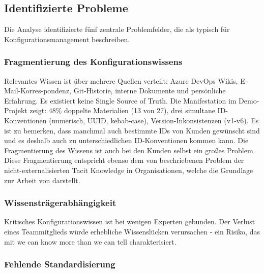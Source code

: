 \subsection{Identifizierte Probleme}
\label{subsec:Probleme}

Die Analyse identifizierte fünf zentrale Problemfelder, die \cite{zuin:llm_tacit_knowledge2025} als typisch für Konfigurationsmanagement beschreiben.

\subsubsection{Fragmentierung des Konfigurationswissens}
\label{subsubsec:Wissensfragmentierung}

Relevantes Wissen ist über mehrere Quellen verteilt: Azure DevOps Wikis, E-Mail-Korres-pondenz, Git-Historie, interne Dokumente und persönliche Erfahrung. Es existiert keine Single Source of Truth. Die Manifestation im Demo-Projekt zeigt: 48\% doppelte Materialien (13 von 27), drei simultane ID-Konventionen (numerisch, UUID, kebab-case), Version-Inkonsistenzen (v1-v6). Es ist zu bemerken, dass manchmal auch bestimmte IDs von Kunden gewünscht sind und es deshalb auch zu unterschiedlichen ID-Konventionen kommen kann. Die Fragmentierung des Wissens ist auch bei den Kunden selbst ein großes Problem.\\

\noindent Diese Fragmentierung entspricht ebenso dem von \cite{nonaka:knowledge_creating_company1995} beschriebenen Problem der nicht-externalisierten Tacit Knowledge in Organisationen, welche die Grundlage zur Arbeit von \cite{zuin:llm_tacit_knowledge2025} darstellt.

\subsubsection{Wissensträgerabhängigkeit}
\label{subsubsec:Wissenstraegerabhaengigkeit}

Kritisches Konfigurationswissen ist bei wenigen Experten gebunden. Der Verlust eines Teammitglieds würde erhebliche Wissenslücken verursachen - ein Risiko, das \cite{polanyi:tacit_dimension1966} mit \glqq we can know more than we can tell\grqq{} charakterisiert.

\subsubsection{Fehlende Standardisierung}
\label{subsubsec:FehlendeStandardisierung}

